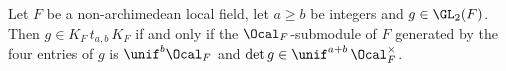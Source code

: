 Let $F$ be a non-archimedean local field, let $a\ge b$ be integers and $g\in\GL_2(F)$. Then
$g\in K_F\,t_{a,b}\,K_F$ if and only if the $\Ocal_F$-submodule of $F$ generated by the four entries of $g$ is
$\unif^b\Ocal_F$ and $\det g\in\unif^{a+b}\,\Ocal_F^\times$.
